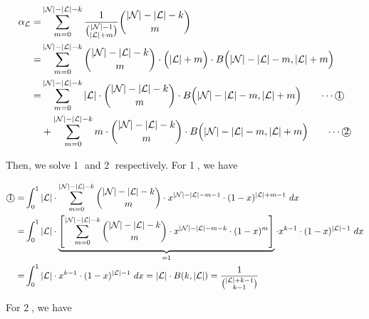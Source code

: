 \begin{small}
\begin{align*}
\alpha_\mathcal{L} =& \sum_{m=0}^{|\mathcal{N}|-|\mathcal{L}|-k}\frac{1}{\binom{|\mathcal{N}|-1}{|\mathcal{L}|+m}}\binom{|\mathcal{N}|-|\mathcal{L}|-k}{m}\\
=& \sum_{m=0}^{|\mathcal{N}|-|\mathcal{L}|-k}\binom{|\mathcal{N}|-|\mathcal{L}|-k}{m}\cdot \Big(|\mathcal{L}|+m\Big)\cdot B\Big(|\mathcal{N}|-|\mathcal{L}|-m, |\mathcal{L}|+m\Big)\\
=& \sum_{m=0}^{|\mathcal{N}|-|\mathcal{L}|-k} |\mathcal{L}|\cdot \binom{|\mathcal{N}|-|\mathcal{L}|-k}{m}\cdot B\Big(|\mathcal{N}|-|\mathcal{L}|-m, |\mathcal{L}|+m\Big) \qquad\text{$\cdots$\textcircled{1}}\\
&+ \sum_{m=0}^{|\mathcal{N}|-|\mathcal{L}|-k} m\cdot \binom{|\mathcal{N}|-|\mathcal{L}|-k}{m}\cdot B\Big(|\mathcal{N}|-|\mathcal{L}|-m, |\mathcal{L}|+m\Big) \qquad\text{$\cdots$\textcircled{2}}
\end{align*}
\end{small}

Then, we solve \textcircled{1} and \textcircled{2} respectively. For \textcircled{1}, we have


\begin{small}
\begin{align*}
\text{\textcircled{1}} =& \int_0^1 |\mathcal{L}|\cdot \sum_{m=0}^{|\mathcal{N}|-|\mathcal{L}|-k}\binom{|\mathcal{N}|-|\mathcal{L}|-k}{m}\cdot x^{|\mathcal{N}|-|\mathcal{L}|-m-1}\cdot (1-x)^{|\mathcal{L}|+m-1}\ dx\\
=& \int_0^1 |\mathcal{L}|\cdot \underbrace{\left[\sum_{m=0}^{|\mathcal{N}|-|\mathcal{L}|-k}\binom{|\mathcal{N}|-|\mathcal{L}|-k}{m}\cdot x^{|\mathcal{N}|-|\mathcal{L}|-m-k}\cdot (1-x)^{m}\right]}_{=1}\cdot x^{k-1}\cdot (1-x)^{|\mathcal{L}|-1}\ dx\\
=& \int_0^1 |\mathcal{L}|\cdot x^{k-1}\cdot (1-x)^{|\mathcal{L}|-1}\ dx = |\mathcal{L}|\cdot B(k, |\mathcal{L}|) = \frac{1}{\binom{|\mathcal{L}|+k-1}{k-1}}
\end{align*}
\end{small}

For \textcircled{2}, we have


